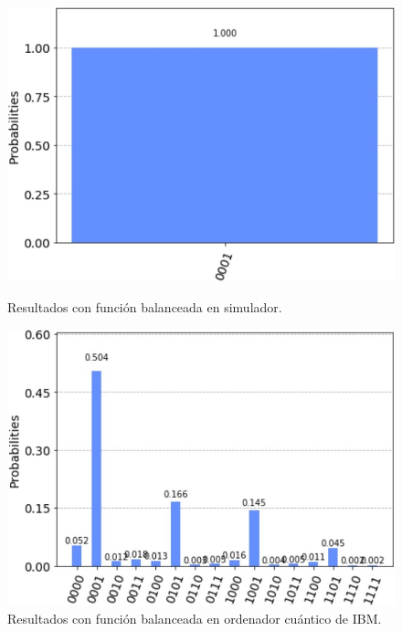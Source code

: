 \begin{figure}[htb!]
    \centering
    \begin{minipage}{0.45\textwidth}
        \centering
        \includegraphics[width=1\textwidth]{images/simulator_balanced}
        \caption{Resultados con función balanceada en simulador.}
        \label{fig:fig64}
    \end{minipage}\hfill
    \begin{minipage}{0.45\textwidth}
        \centering
        \includegraphics[width=1\textwidth]{images/ibmq_balanced}
        \caption{Resultados con función balanceada en ordenador cuántico de IBM.}
        \label{fig:fig65}
    \end{minipage}
\end{figure}

